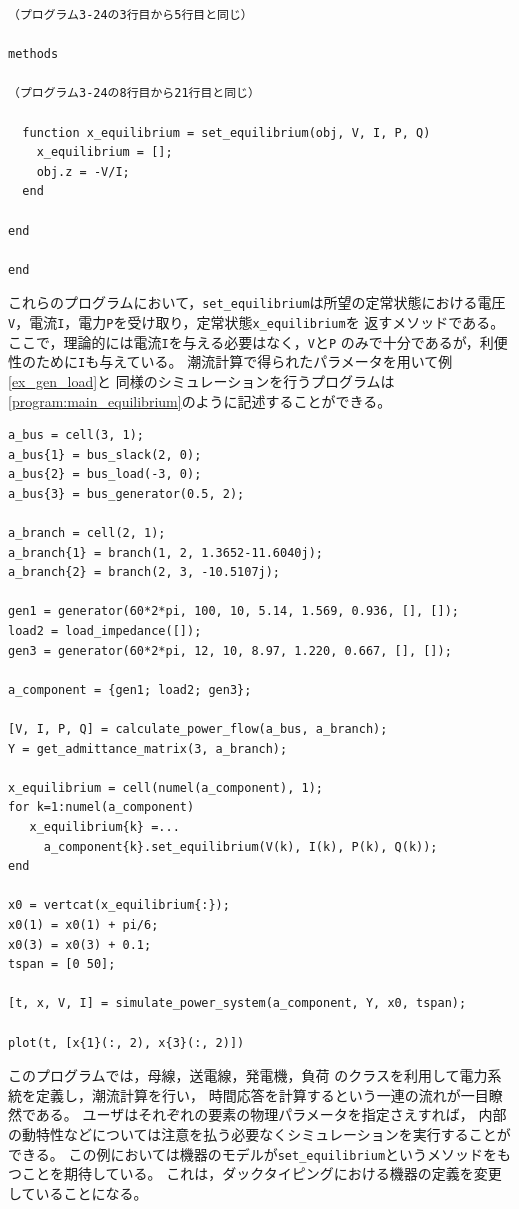 \documentclass[tombow,dvipdfmx]{corona-a5-1.1}
\begin{document}
\begin{例}
\begin{PROGRAMA}[count,title={load\_impedance.m}]
\begin{verbatim}
（プログラム3-24の3行目から5行目と同じ）

methods
  
（プログラム3-24の8行目から21行目と同じ）

  function x_equilibrium = set_equilibrium(obj, V, I, P, Q)
    x_equilibrium = [];
    obj.z = -V/I;
  end

end

end
\end{verbatim}
\end{PROGRAMA}
これらのプログラムにおいて，\verb|set_equilibrium|は所望の定常状態における電圧
\verb|V|，電流\verb|I|，電力\verb|P|を受け取り，定常状態\verb|x_equilibrium|を
返すメソッドである。ここで，理論的には電流\verb|I|を与える必要はなく，\verb|V|と\verb|P|
のみで十分であるが，利便性のために\verb|I|も与えている。
潮流計算で得られたパラメータを用いて例\ref{ex_gen_load}と
同様のシミュレーションを行うプログラムは\ref{program:main_equilibrium}のように記述することができる。
\begin{PROGRAMA}[count,title={main\_simulation\_3bus\_equilibrium.m}]\label{program:main_equilibrium}
\begin{verbatim}
a_bus = cell(3, 1);
a_bus{1} = bus_slack(2, 0);
a_bus{2} = bus_load(-3, 0);
a_bus{3} = bus_generator(0.5, 2);

a_branch = cell(2, 1);
a_branch{1} = branch(1, 2, 1.3652-11.6040j);
a_branch{2} = branch(2, 3, -10.5107j);

gen1 = generator(60*2*pi, 100, 10, 5.14, 1.569, 0.936, [], []);
load2 = load_impedance([]);
gen3 = generator(60*2*pi, 12, 10, 8.97, 1.220, 0.667, [], []);

a_component = {gen1; load2; gen3};

[V, I, P, Q] = calculate_power_flow(a_bus, a_branch);
Y = get_admittance_matrix(3, a_branch);

x_equilibrium = cell(numel(a_component), 1);
for k=1:numel(a_component)
   x_equilibrium{k} =...
     a_component{k}.set_equilibrium(V(k), I(k), P(k), Q(k)); 
end

x0 = vertcat(x_equilibrium{:});
x0(1) = x0(1) + pi/6;
x0(3) = x0(3) + 0.1;
tspan = [0 50];

[t, x, V, I] = simulate_power_system(a_component, Y, x0, tspan);

plot(t, [x{1}(:, 2), x{3}(:, 2)])
\end{verbatim}
\end{PROGRAMA}
このプログラムでは，母線，送電線，発電機，負荷
のクラスを利用して電力系統を定義し，潮流計算を行い，
時間応答を計算するという一連の流れが一目瞭然である。
ユーザはそれぞれの要素の物理パラメータを指定さえすれば，
内部の動特性などについては注意を払う必要なくシミュレーションを実行することができる。
この例においては機器のモデルが\verb|set_equilibrium|というメソッドをもつことを期待している。
これは，ダックタイピングにおける機器の定義を変更していることになる。
\end{例}
\end{document}
